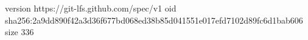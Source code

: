 version https://git-lfs.github.com/spec/v1
oid sha256:2a9dd890f42a3d36f677bd068ed38b85d041551e017efd7102d89fc6d1bab606
size 336
